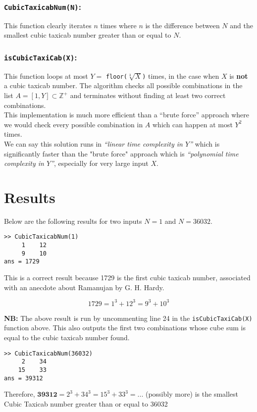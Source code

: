 \documentclass[11pt]{report}
\begin{document}
\subsubsection{\texttt{CubicTaxicabNum(N)}:}
This function clearly iterates $n$ times where $n$ is the difference between $N$ and the smallest cubic taxicab number greater than or equal to $N$.

\subsubsection{\texttt{isCubicTaxiCab(X)}:}
This function loops at most $Y=$ \texttt{floor($\sqrt[3]{X}$)} times, in the case when $X$ is \textbf{not} a cubic taxicab number. The algorithm checks all possible combinations in the list $A=[1,Y]\subset\mathbb{Z^+}$ and terminates without finding at least two correct combinations. \\

This implementation is much more efficient than a ``brute force'' approach where we would check every possible combination in $A$ which can happen at most $Y^2$ times. \\

We can say this solution runs in \textit{``linear time complexity in $Y$''} which is significantly faster than the "brute force" approach which is \textit{``polynomial time complexity in $Y$''}, especially for very large input $X$.
\section{Results}
Below are the following results for two inputs $N=1$ and $N=36032$. \\

\begin{lstlisting}[title={N=1}]
>> CubicTaxicabNum(1)
     1    12
     9    10
ans = 1729
\end{lstlisting}

This is a correct result because 1729 is the first cubic taxicab number, associated with an anecdote about Ramanujan by G. H. Hardy.

\begin{equation*}
	1729 = 1^3 + 12^3 = 9^3 + 10^3
\end{equation*}

\textbf{NB:} The above result is run by uncommenting line 24 in the \texttt{isCubicTaxiCab(X)} function above. This also outputs the first two combinations whose cube sum is equal to the cubic taxicab number found. \\
\begin{lstlisting}[title={N=36032}]
>> CubicTaxicabNum(36032)
     2    34
    15    33
ans = 39312
\end{lstlisting}
Therefore, $\textbf{39312} = 2^3 +34^3 = 15^3 + 33^3 = ...$ (possibly more) is the smallest Cubic Taxicab number greater than or equal to 36032
\end{document}
